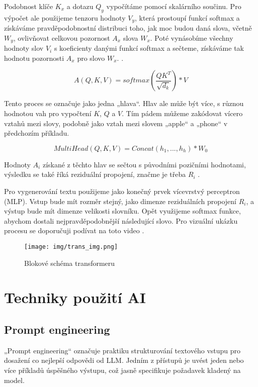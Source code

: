 \documentclass[FM,DP]{tulthesis}
\begin{document}
		Podobnost klíče $K_x$ a dotazu $Q_y$ vypočítáme pomocí skalárního součinu. Pro výpočet ale použijeme tenzoru hodnoty $V_y$, která prostoupí funkcí softmax a získáváme pravděpodobnostní distribuci toho, jak moc budou daná slova, včetně $W_y$, ovlivňovat celkovou pozornost $A_x$ slova $W_x$. Poté vynásobíme všechny hodnoty slov $V_i$ s koeficienty danými funkcí softmax a sečteme, získáváme tak hodnotu pozornosti $A_x$ pro slovo $W_x$. \cite{vaswani2023attention} \cite{rothman2021transformers}.
		
		\begin{equation}
			A(Q, K, V) = softmax(\frac{QK^T}{\sqrt{d_k}})*V
		\end{equation}
		
		Tento proces se označuje jako jedna „hlava“. Hlav ale může být více, s různou hodnotou vah pro vypočtení $K$, $Q$ a $V$. Tím pádem můžeme zakódovat vícero vztahů mezi slovy, podobně jako vztah mezi slovem „apple“ a „phone“ v předchozím příkladu. 
		
		\begin{equation}
			MultiHead(Q, K, V) = Concat(h_1,...,h_h)*W_0
		\end{equation}
		
		Hodnoty $A_i$ získané z těchto hlav se sečtou s původními pozičními hodnotami, výsledku se také říká reziduální propojení, značme je třeba $R_i$ \cite{vaswani2023attention} \cite{rothman2021transformers}.
		
		Pro vygenerování textu použijeme jako konečný prvek vícevrstvý perceptron (MLP). Vstup bude mít rozměr stejný, jako dimenze reziduálních propojení $R_i$, a výstup bude mít dimenze velikosti slovníku. Opět využijeme softmax funkce, abychom dostali nejpravděpodobnější následující slovo. Pro vizuální ukázku procesu se doporučuji podívat na toto video \cite{ytb:transformers} \cite{vaswani2023attention} \cite{rothman2021transformers}.
		
		\begin{figure}[H]
			\centering
			\texttt{[image: img/trans\_img.png]}
			\caption{Blokové schéma transformeru \cite{trans_img}}
			\label{fig:trans}
		\end{figure}
		
		\section{Techniky použití AI} 
		\subsection{Prompt engineering}
		„Prompt engineering“ označuje praktiku strukturování textového vstupu pro dosažení co nejlepší odpovědi od LLM. Jedním z přístupů je uvést jeden nebo více příkladů úspěšného výstupu, což jasně specifikuje požadavek kladený na model. 
		
\end{document}
